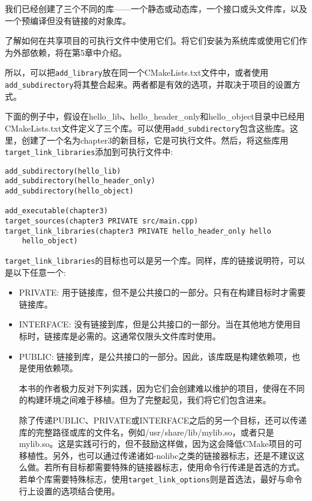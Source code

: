 我们已经创建了三个不同的库——一个静态或动态库，一个接口或头文件库，以及一个预编译但没有链接的对象库。

了解如何在共享项目的可执行文件中使用它们。将它们安装为系统库或使用它们作为外部依赖，将在第5章中介绍。

所以，可以把\texttt{add\_library}放在同一个CMakeLists.txt文件中，或者使用\texttt{add\_subdirectory}将其整合起来。两者都是有效的选项，并取决于项目的设置方式。

下面的例子中，假设在hello\_lib、hello\_header\_only和hello\_object目录中已经用CMakeLists.txt文件定义了三个库。可以使用\texttt{add\_subdirectory}包含这些库。这里，创建了一个名为chapter3的新目标，它是可执行文件。然后，将这些库用\texttt{target\_link\_libraries}添加到可执行文件中:

\begin{lstlisting}[style=styleCMake]
add_subdirectory(hello_lib)
add_subdirectory(hello_header_only)
add_subdirectory(hello_object)

add_executable(chapter3)
target_sources(chapter3 PRIVATE src/main.cpp)
target_link_libraries(chapter3 PRIVATE hello_header_only hello
	hello_object)
\end{lstlisting}

\texttt{target\_link\_libraries}的目标也可以是另一个库。同样，库的链接说明符，可以是以下任意一个:

\begin{itemize}
\item 
PRIVATE: 用于链接库，但不是公共接口的一部分。只有在构建目标时才需要链接库。

\item 
INTERFACE: 没有链接到库，但是公共接口的一部分。当在其他地方使用目标时，链接库是必需的。这通常仅限头文件库时使用。

\item 
PUBLIC: 链接到库，是公共接口的一部分。因此，该库既是构建依赖项，也是使用依赖项。

\begin{tcolorbox}[colback=red!5!white,colframe=red!75!black,title=不推荐的做法]
本书的作者极力反对下列实践，因为它们会创建难以维护的项目，使得在不同的构建环境之间难于移植。但为了完整起见，我们将它们包含进来。

除了传递PUBLIC、PRIVATE或INTERFACE之后的另一个目标，还可以传递库的完整路径或库的文件名，例如/usr/share/lib/mylib.so，或者只是mylib.so。这是实践可行的，但不鼓励这样做，因为这会降低CMake项目的可移植性。另外，也可以通过传递诸如-nolibc之类的链接器标志，还是不建议这么做。若所有目标都需要特殊的链接器标志，使用命令行传递是首选的方式。若单个库需要特殊标志，使用\texttt{target\_link\_options}则是首选法，最好与命令行上设置的选项结合使用。
\end{tcolorbox}
\end{itemize}

